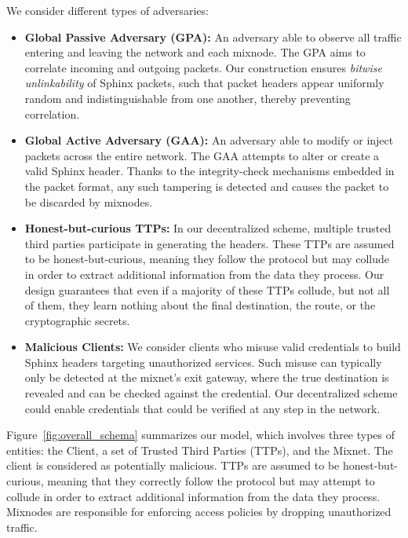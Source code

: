 We consider different types of adversaries:
\begin{itemize}
        \item \textbf{Global Passive Adversary (GPA):} An adversary able to observe all traffic entering and leaving the network and each mixnode. 
        The GPA aims to correlate incoming and outgoing packets. 
        Our construction ensures \emph{bitwise unlinkability} of Sphinx packets, such that packet headers appear uniformly random and indistinguishable from one another, thereby preventing correlation.
        
        \item \textbf{Global Active Adversary (GAA):} An adversary able to modify or inject packets across the entire network. 
        The GAA attempts to alter or create a valid Sphinx header. 
        Thanks to the integrity-check mechanisms embedded in the packet format, any such tampering is detected and causes the packet to be discarded by mixnodes.

        \item \textbf{Honest-but-curious TTPs:} 
        In our decentralized scheme, multiple trusted third parties participate in generating the headers. 
        These TTPs are assumed to be honest-but-curious, meaning they follow the protocol but may collude in order to extract additional information from the data they process.
        Our design guarantees that even if a majority of these TTPs collude, but not all of them, they learn nothing about the final destination, the route, or the cryptographic secrets.
        
        \item \textbf{Malicious Clients:} We consider clients who misuse valid credentials to build Sphinx headers targeting unauthorized services. 
        Such misuse can typically only be detected at the mixnet's exit gateway, where the true destination is revealed and can be checked against the credential. 
        Our decentralized scheme could enable credentials that could be verified at any step in the network.
\end{itemize}
Figure~\ref{fig:overall_schema} summarizes our model, which involves three types of entities: the Client, a set of Trusted Third Parties (TTPs), and the Mixnet.
The client is considered as potentially malicious.
TTPs are assumed to be honest-but-curious, meaning that they correctly follow the protocol but may attempt to collude in order to extract additional information from the data they process.
Mixnodes are responsible for enforcing access policies by dropping unauthorized traffic.

